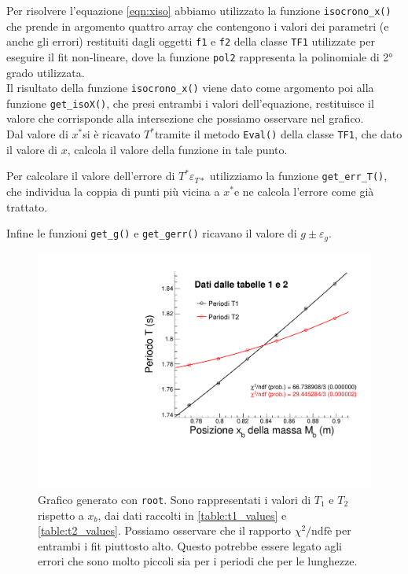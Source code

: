 \documentclass[italian, a4paper, 10pt, twocolumn]{../../style/lab_unige}
\newcommand{\stdErr}[1]{$\varepsilon_{#1}$}
\newcommand{\mstdErr}[1]{\varepsilon_{#1}}
\newcommand{\ChiNdf}{$\chi^2/\text{ndf}$}
\newcommand{\cernroot}{\texttt{root}}
\newcommand{\Tiso}{$T^*$}
\newcommand{\xiso}{$x^*$}
\begin{document}
    Per risolvere l'equazione \ref{eqn:xiso} abbiamo utilizzato la funzione \verb|isocrono_x()| che prende in argomento quattro array che contengono i valori dei parametri (e anche gli errori) restituiti dagli oggetti  \verb|f1| e \verb|f2| della classe \verb|TF1| utilizzate per eseguire il fit non-lineare, dove la funzione \verb|pol2| rappresenta la polinomiale di 2° grado utilizzata.\\
    Il risultato della funzione \verb|isocrono_x()| viene dato come argomento poi alla funzione \verb|get_isoX()|, che presi entrambi i valori dell'equazione, restituisce il valore che corrisponde alla intersezione che possiamo osservare nel grafico.\\
    Dal valore di \xiso si è ricavato \Tiso tramite il metodo \verb|Eval()| della classe \verb|TF1|, che dato il valore di $x$, calcola il valore della funzione in tale punto.

    Per calcolare il valore dell'errore di \Tiso \stdErr{T*} utilizziamo la funzione \verb|get_err_T()|, che individua la coppia di punti più vicina a \xiso e ne calcola l'errore come già trattato.

    Infine le funzioni \verb|get_g()| e \verb|get_gerr()| ricavano il valore di $g\pm\mstdErr{g}$.

    \begin{figure}
        \includegraphics[width=\linewidth]{kater_plot.pdf}
        \caption{Grafico generato con \cernroot. Sono rappresentati i valori di $T_1$ e $T_2$ rispetto a $x_b$, dai dati raccolti in \autoref{table:t1_values} e \autoref{table:t2_values}. Possiamo osservare che il rapporto \ChiNdf è per entrambi i fit piuttosto alto. Questo potrebbe essere legato agli errori che sono molto piccoli sia per i periodi che per le lunghezze. }
        \label{figure:plot}
    \end{figure}
\end{document}
